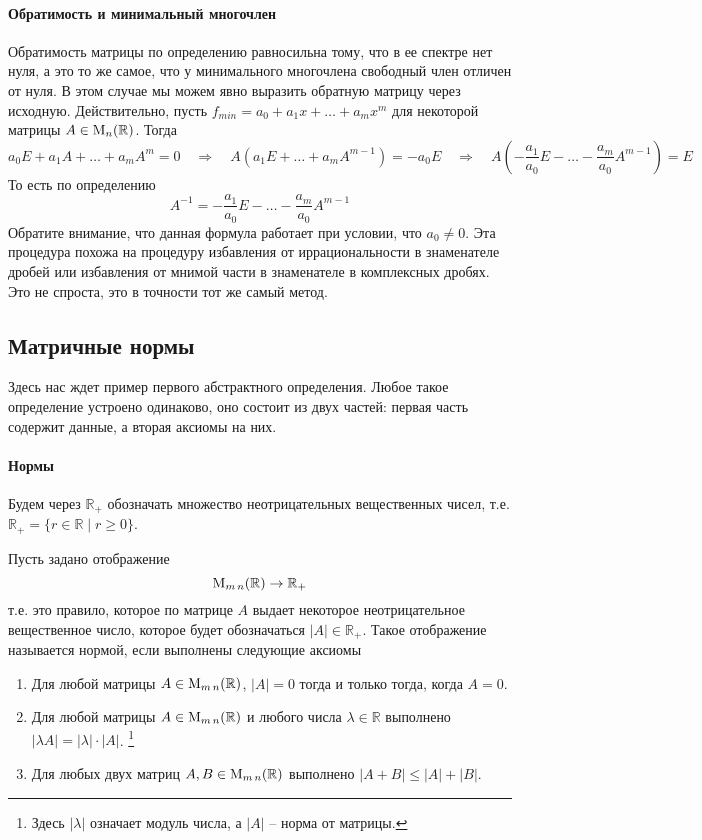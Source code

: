 \paragraph{Обратимость и минимальный многочлен}

Обратимость матрицы по определению равносильна тому, что в ее спектре нет нуля, а это то же самое, что у минимального многочлена свободный член отличен от нуля.
В этом случае мы можем явно выразить обратную матрицу через исходную.
Действительно, пусть $f_{min} = a_0 + a_1 x + \ldots + a_m x^m$ для некоторой матрицы $A\in \operatorname{M}_{n}(\mathbb R)$.
Тогда
\[
a_0E + a_1 A + \ldots + a_m A^m =  0 \quad\Rightarrow\quad  A (a_1 E + \ldots + a_m A^{m-1}) =  -a_0 E \quad\Rightarrow\quad A \left(-\frac{a_1}{a_0} E - \ldots -\frac{ a_m}{a_0} A^{m-1}\right) = E
\]
То есть по определению
\[
A^{-1} = -\frac{a_1}{a_0} E - \ldots -\frac{ a_m}{a_0} A^{m-1}
\]
Обратите внимание, что данная формула работает при условии, что $a_0 \neq 0$.
Эта процедура похожа на процедуру избавления от иррациональности в знаменателе дробей или избавления от мнимой части в знаменателе в комплексных дробях.
Это не спроста, это в точности тот же самый метод.


\subsection{Матричные нормы}

Здесь нас ждет пример первого абстрактного определения.
Любое такое определение устроено одинаково, оно состоит из двух частей: первая часть содержит данные, а вторая аксиомы на них.

\paragraph{Нормы}

Будем через $\mathbb R_+$ обозначать множество неотрицательных вещественных чисел, т.е. $\mathbb R_+ = \{r\in \mathbb R\mid r \geqslant 0\}$.

Пусть задано отображение 
\[
\operatorname{M}_{m\,n}(\mathbb R)\to \mathbb R_+
\]
т.е. это правило, которое по матрице $A$ выдает некоторое неотрицательное вещественное число, которое будет обозначаться $|A|\in\mathbb R_+$.
Такое отображение называется нормой, если выполнены следующие аксиомы
\begin{enumerate}
\item Для любой матрицы $A\in\operatorname{M}_{m\,n}(\mathbb R)$, $|A| = 0$ тогда и только тогда, когда $A = 0$.

\item Для любой матрицы $A\in\operatorname{M}_{m\,n}(\mathbb R)$ и любого числа $\lambda\in\mathbb R$ выполнено $|\lambda A| = |\lambda| \cdot |A|$.%
\footnote{Здесь $|\lambda|$ означает модуль числа, а $|A|$ -- норма от матрицы.}

\item Для любых двух матриц $A, B \in\operatorname{M}_{m\,n}(\mathbb R)$ выполнено $|A + B|\leqslant |A| + |B|$.
\end{enumerate}



